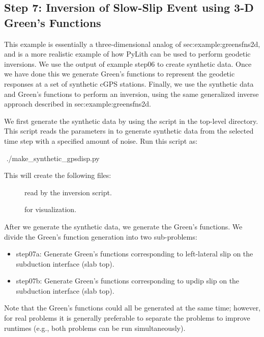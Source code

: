 \subsection{Step 7: Inversion of Slow-Slip Event using 3-D Green's Functions}

This example is essentially a three-dimensional analog of
{sec:example:greensfns2d}, and is a more realistic example of how
PyLith can be used to perform geodetic inversions. We use the output
of example step06 to create synthetic data. Once we have done this we
generate Green's functions to represent the geodetic responses at a
set of synthetic cGPS stations. Finally, we use the synthetic data and
Green's functions to perform an inversion, using the same generalized
inverse approach described in {sec:example:greensfns2d}.

We first generate the synthetic data by using the script
 in the top-level directory. This
script reads the parameters in 
to generate synthetic data from the selected time step with a
specified amount of noise. Run this script as:
\begin{shell}
$$ ./make_synthetic_gpsdisp.py
\end{shell}
This will create the following files:
\begin{description}
\item[] read by the
  inversion script.
\item[] for visualization.
\end{description}

After we generate the synthetic data, we generate the Green's
functions. We divide the Green's function generation into two sub-problems:
\begin{itemize}
 \item step07a:  Generate Green's functions corresponding to
   left-lateral slip on the subduction interface (slab top).
 \item step07b:  Generate Green's functions corresponding to
   updip slip on the subduction interface (slab top).
\end{itemize}
Note that the Green's functions could all be generated at the same
time; however, for real problems it is generally preferable to
separate the problems to improve runtimes (e.g., both problems can be
run simultaneously).

